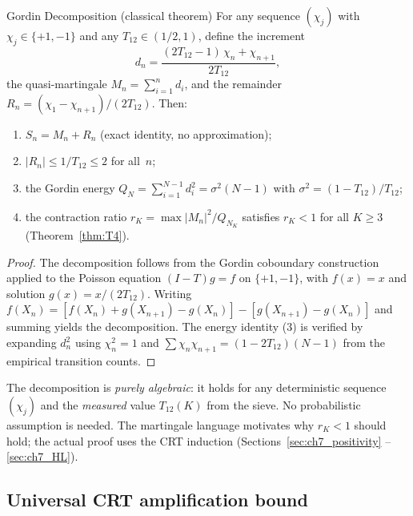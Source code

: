 \documentclass[12pt,a4paper]{article}
\begin{document}
\begin{thmbox}{Gordin Decomposition (classical theorem)}
\label{thm:gordin}
For any sequence $(\chi_j)$ with $\chi_j \in \{+1,-1\}$ and any
$T_{12} \in (1/2,1)$, define the increment
\begin{equation}
  d_n = \frac{(2T_{12}-1)\,\chi_n + \chi_{n+1}}{2T_{12}},
  \label{eq:gordin_increment}
\end{equation}
the quasi-martingale $M_n = \sum_{i=1}^n d_i$, and the remainder
$R_n = (\chi_1 - \chi_{n+1})/(2T_{12})$. Then:
\begin{enumerate}[nosep]
\item $S_n = M_n + R_n$ \quad (exact identity, no approximation);
\item $|R_n| \leq 1/T_{12} \leq 2$ for all~$n$;
\item the Gordin energy $Q_N = \sum_{i=1}^{N-1} d_i^2 = \sigma^2(N-1)$
  with $\sigma^2 = (1-T_{12})/T_{12}$;
\item the contraction ratio $r_K = \max|M_n|^2/Q_{N_K}$ satisfies
  $r_K < 1$ for all $K \geq 3$ (Theorem~\ref{thm:T4}).
\end{enumerate}

\begin{proof}
The decomposition follows from the Gordin coboundary
construction~\cite{Gordin1969} applied to the Poisson equation
$(I-T)g = f$ on $\{+1,-1\}$, with $f(x)=x$ and solution
$g(x) = x/(2T_{12})$. Writing
$f(X_n) = [f(X_n) + g(X_{n+1}) - g(X_n)] - [g(X_{n+1}) - g(X_n)]$
and summing yields the decomposition. The energy identity (3) is
verified by expanding $d_n^2$ using $\chi_n^2 = 1$ and
$\sum \chi_n\chi_{n+1} = (1-2T_{12})(N-1)$ from the empirical
transition counts.
\end{proof}
\end{thmbox}

\begin{remark}
The decomposition is \emph{purely algebraic}: it holds for any
deterministic sequence $(\chi_j)$ and the \emph{measured} value
$T_{12}(K)$ from the sieve. No probabilistic assumption is needed.
The martingale language motivates why $r_K < 1$ should hold; the
actual proof uses the CRT induction (Sections~\ref{sec:ch7_positivity}%
--\ref{sec:ch7_HL}).
\end{remark}

\subsection{Universal CRT amplification bound}
\label{sec:ch7_AK}
\end{document}
